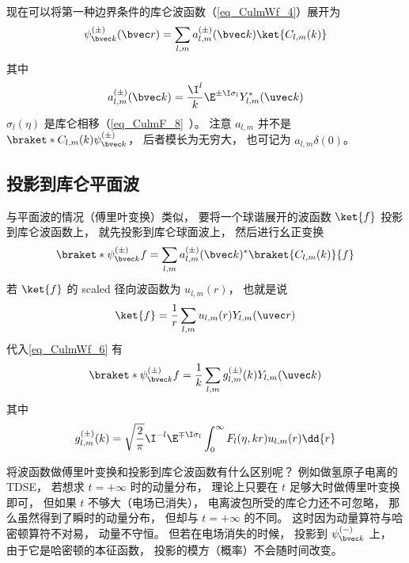 现在可以将第一种边界条件的库仑波函数（\autoref{eq_CulmWf_4}）展开为
\begin{equation}\label{eq_CulmWf_9}
\psi_{\bvec k}^{(\pm)}(\bvec r) =  \sum_{l,m} a_{l,m}^{(\pm)}(\bvec k) \ket{C_{l,m}(k)}
\end{equation}
其中
\begin{equation}\label{eq_CulmWf_10}
a_{l,m}^{(\pm)}(\bvec k) = \frac{\I^l}{k} \E^{\pm\I\sigma_l} Y_{l,m}^* (\uvec k)
\end{equation}
$\sigma_l(\eta)$ 是库仑相移（\autoref{eq_CulmF_8}~）。 注意 $a_{l,m}$ 并不是 $\braket*{C_{l,m}(k)}{\psi_{\bvec k}^{(\pm)}}$， 后者模长为无穷大， 也可记为 $a_{l,m}\delta(0)$。

\subsection{投影到库仑平面波}
与平面波的情况（傅里叶变换）类似， 要将一个球谐展开的波函数 $\ket{f}$ 投影到库仑波函数上， 就先投影到库仑球面波上， 然后进行幺正变换
\begin{equation}\label{eq_CulmWf_6}
\braket*{\psi_{\bvec k}^{(\pm)}}{f} = \sum_{l,m}  a_{l,m}^{(\pm)}(\bvec k)^* \braket{C_{l,m}(k)}{f}
\end{equation}
若 $\ket{f}$ 的 scaled 径向波函数为 $u_{l,m}(r)$， 也就是说
\begin{equation}
\ket{f} = \frac{1}{r}\sum_{l,m}u_{l,m}(r) Y_{l,m}(\uvec r)
\end{equation}
代入\autoref{eq_CulmWf_6} 有
\begin{equation}\label{eq_CulmWf_3}
\braket*{\psi_{\bvec k}^{(\pm)}}{f} = \frac{1}{k} \sum_{l,m} g_{l,m}^{(\pm)}(k) Y_{l,m}(\uvec k)
\end{equation}
其中
\begin{equation}\label{eq_CulmWf_8}
g_{l,m}^{(\pm)}(k) = \sqrt{\frac{2}{\pi}} \I^{-l} \E^{\mp\I\sigma_l} \int_0^\infty F_l(\eta, kr) u_{l,m}(r) \dd{r}
\end{equation}

将波函数做傅里叶变换和投影到库仑波函数有什么区别呢？ 例如做氢原子电离的 TDSE， 若想求 $t = +\infty$ 时的动量分布， 理论上只要在 $t$ 足够大时做傅里叶变换即可， 但如果 $t$ 不够大（电场已消失）， 电离波包所受的库仑力还不可忽略， 那么虽然得到了瞬时的动量分布， 但却与 $t = +\infty$ 的不同。 这时因为动量算符与哈密顿算符不对易， 动量不守恒。 但若在电场消失的时候， 投影到 $\psi_{\bvec k}^{(-)}$ 上， 由于它是哈密顿的本征函数， 投影的模方（概率）不会随时间改变。

